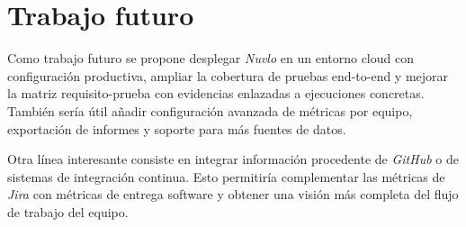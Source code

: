 \section{Trabajo futuro}

Como trabajo futuro se propone desplegar \textit{Nuvlo} en un entorno cloud con configuración productiva, ampliar la cobertura de pruebas end-to-end y mejorar la matriz requisito-prueba con evidencias enlazadas a ejecuciones concretas. También sería útil añadir configuración avanzada de métricas por equipo, exportación de informes y soporte para más fuentes de datos.

Otra línea interesante consiste en integrar información procedente de \textit{GitHub} o de sistemas de integración continua. Esto permitiría complementar las métricas de \textit{Jira} con métricas de entrega software y obtener una visión más completa del flujo de trabajo del equipo.
